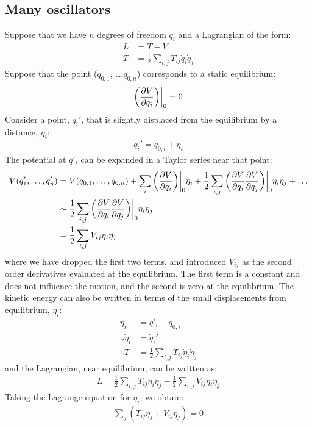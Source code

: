 \subsection{Many oscillators}
Suppose that we have $n$ degrees of freedom $q_i$ and a Lagrangian of the form:
\begin{align}
L&=T-V\nonumber\\
T&=\frac{1}{2}\sum_{i,j} T_{ij}\dot{q}_i\dot q_j
\end{align}
Suppose that the point ($q_{0,1}$, \dots ,$q_{0,n}$) corresponds to a static equilibrium:
\begin{align}
\left(\frac{\partial V}{\partial q_i}\right)\biggr\rvert_0=0
\end{align}
Consider a point, $q_i'$, that is slightly displaced from the equilibrium by a distance, $\eta_i$:
\begin{align}
q_i'=q_{0,i}+\eta_i
\end{align}
The potential at $q'_i$ can be expanded in a Taylor series near that point:
\begin{align}
V(q_1',\dots ,q_n')&=V(q_{0,1}, \dots , q_{0,n})+\sum_i\left(\frac{\partial V}{\partial q_i}\right)\biggr\rvert_0\eta_i+\frac{1}{2}\sum_{i,j}\left(\frac{\partial V}{\partial q_i}\frac{\partial V}{\partial q_j}\right)\biggr\rvert_0\eta_i\eta_j+\dots\nonumber\\
&\sim\frac{1}{2}\sum_{i,j}\left(\frac{\partial V}{\partial q_i}\frac{\partial V}{\partial q_j}\right)\biggr\rvert_0\eta_i\eta_j\nonumber\\
&=\frac{1}{2}\sum_{i,j} V_{ij}\eta_i\eta_j
\end{align}
where we have dropped the first two terms, and introduced $V_{ij}$ as the second order derivatives evaluated at the equilibrium. The first term is a constant and does not influence the motion, and the second is zero at the equilibrium. The kinetic energy can also be written in terms of the small displacements from equilibrium, $\eta_i$:
\begin{align}
\eta_i&=q'_i-q_{0,i}\nonumber\\
\therefore \dot\eta_i&=\dot q_i'\nonumber\\
\therefore T&=\frac{1}{2}\sum_{i,j} T_{ij}\dot\eta_i\dot\eta_j
\end{align}
and the Lagrangian, near equilibrium, can be written as:
\begin{align}
L=\frac{1}{2}\sum_{i,j} T_{ij}\dot\eta_i\dot\eta_j-\frac{1}{2}\sum_{i,j}V_{ij}\eta_i\eta_j
\end{align}
Taking the Lagrange equation for $\eta_i$, we obtain:
\begin{align}
\sum_{j}\left(T_{ij}\ddot\eta_j+V_{ij}\eta_j\right)=0
\end{align}
